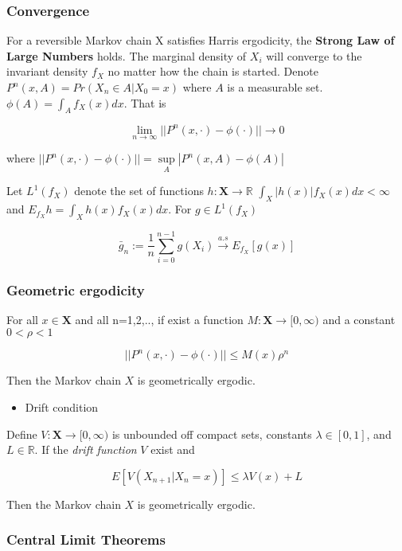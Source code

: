 \documentclass[12pt]{article}
\providecommand{\tightlist}{%
  \setlength{\itemsep}{0pt}\setlength{\parskip}{0pt}}
\begin{document}
\hypertarget{convergence}{%
\subsubsection{Convergence}\label{convergence}}

For a reversible Markov chain X satisfies Harris ergodicity, the
\textbf{Strong Law of Large Numbers} holds. The marginal density of
\(X_i\) will converge to the invariant density \(f_{X}\) no matter how
the chain is started. Denote \(P^{n}(x,A)=Pr(X_n\in A|X_0=x)\) where
\(A\) is a measurable set. \(\phi(A)=\int_A f_X(x)dx\). That is

\[\lim_{n\to\infty}||P^{n}(x,\cdot)-\phi(\cdot)||\to 0\]

where
\(||P^{n}(x,\cdot)-\phi(\cdot)||=\underset{A}{\sup}|P^{n}(x,A)-\phi(A)|\)

Let \(L^1(f_X)\) denote the set of functions
\(h: \mathbf{X}\to \mathbb{R}\) \(\int_X |h(x)|f_X(x)dx<\infty\) and
\(E_{f_{X}}h=\int_X h(x)f_X(x)dx\). For \(g\in L^1(f_X)\)

\[\bar g_n := \frac{1}{n}\sum_{i=0}^{n-1} g(X_i)\overset{a.s}{\to}E_{f_{X}}[g(x)]\]

\hypertarget{geometric-ergodicity}{%
\subsubsection{Geometric ergodicity}\label{geometric-ergodicity}}

For all \(x\in \mathbf{X}\) and all n=1,2,.., if exist a function
\(M: \mathbf{X}\to [0,\infty)\) and a constant \(0<\rho<1\)

\[||P^{n}(x,\cdot)-\phi(\cdot)||\le M(x) \rho^n\]

Then the Markov chain \(X\) is geometrically ergodic.

\begin{itemize}
\tightlist
\item
  Drift condition
\end{itemize}

Define \(V: \mathbf{X}\to[0,\infty)\) is unbounded off compact sets,
constants \(\lambda\in[0,1]\), and \(L\in\mathbb{R}\). If the
\emph{drift function} \(V\) exist and

\[E[V(X_{n+1}|X_n=x)]\le\lambda V(x)+L\]

Then the Markov chain \(X\) is geometrically ergodic.

\hypertarget{central-limit-theorems}{%
\subsubsection{Central Limit Theorems}\label{central-limit-theorems}}
\end{document}
